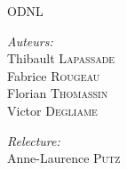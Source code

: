 \documentclass{report}
\begin{document}
\dominitoc







\begin{titlepage}
\begin{center}
\textsc{\LARGE ODNL}\\[1.5cm]
\end{center}

\begin{minipage}{0.4\textwidth}
	\begin{flushleft} \large
		\emph{Auteurs:}\\
			Thibault \textsc{Lapassade} \\
			Fabrice \textsc{Rougeau} \\
			Florian \textsc{Thomassin} \\
			Victor \textsc{Degliame}
	\end{flushleft}
\end{minipage}
\begin{minipage}{0.4\textwidth}
	\begin{flushright} \large
		\emph{Relecture:} \\
              Anne-Laurence \textsc{Putz}
	\end{flushright}
\end{minipage}
\end{titlepage}
\end{document}
